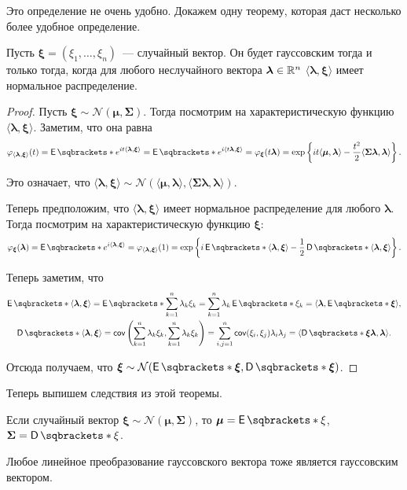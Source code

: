 Это определение не очень удобно. Докажем одну теорему, которая даст несколько 
более удобное определение.
\begin{theorem}
	Пусть \(\bm{\xi} = (\xi_{1}, \dots, \xi_{n})\)~--- случайный вектор. Он 
	будет гауссовским тогда и только тогда, когда для любого неслучайного 
	вектора \(\bm{\lambda} \in \mathbb{R}^{n}\) \(\langle\bm{\lambda}, 
	\bm{\xi}\rangle\) имеет нормальное распределение.
\end{theorem}
\begin{proof}
	Пусть \(\bm{\xi} \sim \mathcal{N}(\bm{\mu}, \bm{\Sigma})\). Тогда посмотрим 
	на характеристическую функцию \(\langle\bm{\lambda}, \bm{\xi}\rangle\). 
	Заметим, что она равна
	\[
		\phi_{\langle\bm{\lambda}, \bm{\xi}\rangle}(t) = 
		\E{e^{it\langle\bm{\lambda}, \bm{\xi}\rangle}} = \E{e^{i\langle 
		t\bm{\lambda}, \bm{\xi}\rangle}} = \phi_{\bm{\xi}}(t\bm{\lambda}) = 
		\exp\left\{it\langle\bm{\mu}, \bm{\lambda}\rangle - 
		\frac{t^{2}}{2}\langle\mathbf{\Sigma}\bm{\lambda}, 
		\bm{\lambda}\rangle\right\}.
	\]
	
	Это означает, что \(\langle\bm{\lambda}, \bm{\xi}\rangle \sim 
	\mathcal{N}(\langle\bm{\mu}, \bm{\lambda}\rangle, \langle 
	\mathbf{\Sigma}\bm{\lambda}, \bm{\lambda}\rangle)\).
	
	Теперь предположим, что \(\langle\bm{\lambda}, \bm{\xi}\rangle\) имеет 
	нормальное распределение для любого \(\bm{\lambda}\). Тогда посмотрим на 
	характеристическую функцию \(\bm{\xi}\):
	\[
		\phi_{\bm{\xi}}(\bm{\lambda}) = \E{e^{i\langle\bm{\lambda}, 
		\bm{\xi}\rangle}} = \phi_{\langle \bm{\lambda}, \bm{\xi}\rangle}(1) = 
		\exp\left\{i\E{\langle\bm{\lambda}, \bm{\xi}\rangle} - 
		\frac{1}{2}\D{\langle\bm{\lambda},\bm{\xi}\rangle}\right\}.
	\]
	
	Теперь заметим, что
	\begin{gather}
		\E{\langle\bm{\lambda}, \bm{\xi}\rangle} = \E{\sum_{k = 
		1}^{n}\lambda_{k}\xi_{k}} = \sum_{k = 1}^{n}\lambda_{k}\E{\xi_{k}} = 
		\langle\bm{\lambda}, \E{\bm{\xi}}\rangle, \\
		\D{\langle\bm{\lambda}, \bm{\xi}\rangle} = \cov\left(\sum_{k = 
		1}^{n}\lambda_{k}\xi_{k}, \sum_{k = 1}^{n}\lambda_{k}\xi_{k}\right) = 
		\sum_{i, j = 1}^{n} \cov(\xi_{i}, \xi_{j})\lambda_{i}\lambda_{j} = 
		\langle\D{\bm{\xi}}\bm{\lambda}, \bm{\lambda}\rangle.
	\end{gather}

	Отсюда получаем, что \(\bm{\xi} \sim \mathcal{N}(\E{\bm{\xi}}, 
	\D{\bm{\xi}})\).
\end{proof}
Теперь выпишем следствия из этой теоремы.
\begin{consequence}
	Если случайный вектор \(\bm{\xi} \sim \mathcal{N}(\bm{\mu}, 
	\mathbf{\Sigma})\), то \(\bm{\mu} = \E{\xi}\), \(\mathbf{\Sigma} = 
	\D{\xi}\).
\end{consequence}
\begin{consequence}
	Любое линейное преобразование гауссовского вектора тоже является 
	гауссовским вектором.
\end{consequence}

